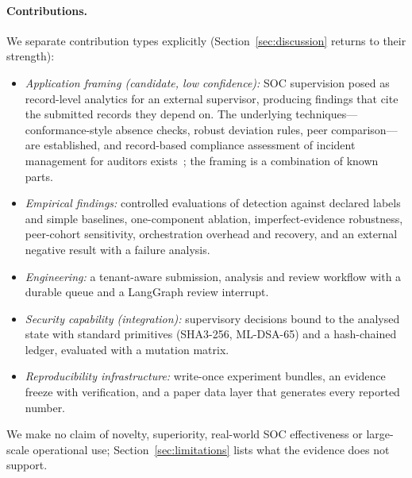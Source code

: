 \paragraph{Contributions.}
We separate contribution types explicitly (Section~\ref{sec:discussion} returns to
their strength):
\begin{itemize}
\item \emph{Application framing (candidate, low confidence):} SOC supervision posed as
  record-level analytics for an external supervisor, producing findings that cite
  the submitted records they depend on. The underlying techniques---conformance-style
  absence checks, robust deviation rules, peer comparison---are established, and
  record-based compliance assessment of incident management for auditors
  exists~\cite{palma2024compliance}; the framing is a combination of known parts.
\item \emph{Empirical findings:} controlled evaluations of detection against declared
  labels and simple baselines, one-component ablation, imperfect-evidence robustness,
  peer-cohort sensitivity, orchestration overhead and recovery, and an external
  negative result with a failure analysis.
\item \emph{Engineering:} a tenant-aware submission, analysis and review workflow with
  a durable queue and a LangGraph review interrupt.
\item \emph{Security capability (integration):} supervisory decisions bound to the
  analysed state with standard primitives (SHA3-256, ML-DSA-65) and a hash-chained
  ledger, evaluated with a mutation matrix.
\item \emph{Reproducibility infrastructure:} write-once experiment bundles, an evidence
  freeze with verification, and a paper data layer that generates every reported
  number.
\end{itemize}

We make no claim of novelty, superiority, real-world SOC effectiveness or
large-scale operational use; Section~\ref{sec:limitations} lists what the evidence
does not support.
